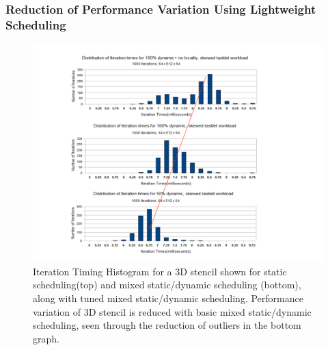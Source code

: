\begin{frame}
\frametitle{Reduction of Performance Variation Using Lightweight Scheduling}  
\begin{figure}     
\includegraphics[scale=0.35]{./plots/IterTimesHisto-sdImprovement.pdf} 
\caption{\small Iteration Timing Histogram for a 3D stencil shown for static scheduling(top) and mixed static/dynamic scheduling (bottom), along with tuned mixed static/dynamic scheduling. Performance variation of 3D stencil is reduced with basic mixed static/dynamic scheduling, seen through the reduction of outliers in the bottom graph.}      
\end{figure}
\end{frame}


